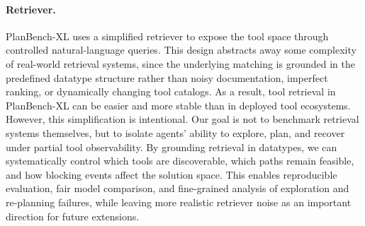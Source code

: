 \documentclass{llmxive}
\providecommand{\bench}[1]{PlanBench-XL}
\begin{document}

\paragraph{Retriever.} 


\bench{} uses a simplified retriever to expose the tool space through controlled natural-language queries. 
This design abstracts away some complexity of real-world retrieval systems, since the underlying matching is grounded in the predefined datatype structure rather than noisy documentation, imperfect ranking, or dynamically changing tool catalogs. 
As a result, tool retrieval in \bench{} can be easier and more stable than in deployed tool ecosystems. 
However, this simplification is intentional.
Our goal is not to benchmark retrieval systems themselves, but to isolate agents' ability to explore, plan, and recover under partial tool observability. 
By grounding retrieval in datatypes, we can systematically control which tools are discoverable, which paths remain feasible, and how blocking events affect the solution space. 
This enables reproducible evaluation, fair model comparison, and fine-grained analysis of exploration and re-planning failures, while leaving more realistic retriever noise as an important direction for future extensions.
\end{document}
